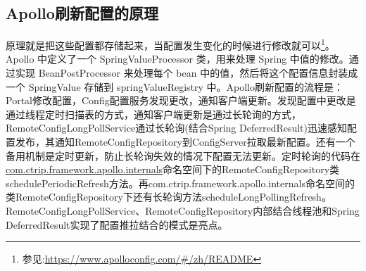 \documentclass[../../../interview-questions.tex]{subfiles}
\begin{document}
\subsection{Apollo刷新配置的原理}

原理就是把这些配置都存储起来，当配置发生变化的时候进行修改就可以\footnote{参见:\url{https://www.apolloconfig.com/\#/zh/README}}。Apollo 中定义了一个 SpringValueProcessor 类，用来处理 Spring 中值的修改。通过实现 BeanPostProcessor 来处理每个 bean 中的值，然后将这个配置信息封装成一个 SpringValue 存储到 springValueRegistry 中。Apollo刷新配置的流程是：Portal修改配置，Config配置服务发现更改，通知客户端更新。发现配置中更改是通过线程定时扫描表的方式，通知客户端更新是通过长轮询的方式，RemoteConfigLongPollService通过长轮询(结合Spring DeferredResult)迅速感知配置发布，其通知RemoteConfigRepository到ConfigServer拉取最新配置。还有一个备用机制是定时更新，防止长轮询失效的情况下配置无法更新。定时轮询的代码在\url{com.ctrip.framework.apollo.internals}命名空间下的RemoteConfigRepository类schedulePeriodicRefresh方法。再com.ctrip.framework.apollo.internals命名空间的类RemoteConfigRepository下还有长轮询方法scheduleLongPollingRefresh。RemoteConfigLongPollService、RemoteConfigRepository内部结合线程池和Spring DeferredResult实现了配置推拉结合的模式是亮点。
\end{document}
